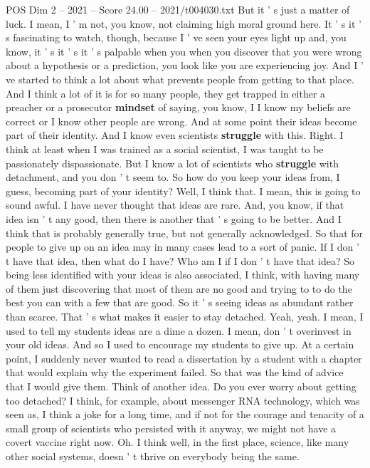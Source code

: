 \begin{textsample}{POS Dim 2 – 2021 – Score 24.00 – 2021/t004030.txt}
But it ' s just a matter of luck.
I mean, I ' m not, you know, not claiming high moral ground here.
It ' s it ' s fascinating to watch, though, because I ' ve seen your eyes light up and, you know, it ' s it ' s it ' s palpable when you when you discover that you were wrong about a hypothesis or a prediction, you look like you are experiencing joy.
And I ' ve started to think a lot about what prevents people from getting to that place.
And I think a lot of it is for so many people, they get trapped in either a preacher or a prosecutor \textbf{mindset} of saying, you know, I I know my beliefs are correct or I know other people are wrong.
And at some point their ideas become part of their identity.
And I know even scientists \textbf{struggle} with this.
Right.
I think at least when I was trained as a social scientist, I was taught to be passionately dispassionate.
But I know a lot of scientists who \textbf{struggle} with detachment, and you don ' t seem to.
So how do you keep your ideas from, I guess, becoming part of your identity?
Well, I think that.
I mean, this is going to sound awful.
I have never thought that ideas are rare.
And, you know, if that idea isn ' t any good, then there is another that ' s going to be better.
And I think that is probably generally true, but not generally acknowledged.
So that for people to give up on an idea may in many cases lead to a sort of panic.
If I don ' t have that idea, then what do I have?
Who am I if I don ' t have that idea?
So being less identified with your ideas is also associated, I think, with having many of them just discovering that most of them are no good and trying to to do the best you can with a few that are good.
So it ' s seeing ideas as abundant rather than scarce.
That ' s what makes it easier to stay detached.
Yeah, yeah.
I mean, I used to tell my students ideas are a dime a dozen.
I mean, don ' t overinvest in your old ideas.
And so I used to encourage my students to give up.
At a certain point, I suddenly never wanted to read a dissertation by a student with a chapter that would explain why the experiment failed.
So that was the kind of advice that I would give them.
Think of another idea.
Do you ever worry about getting too detached?
I think, for example, about messenger RNA technology, which was seen as, I think a joke for a long time, and if not for the courage and tenacity of a small group of scientists who persisted with it anyway, we might not have a covert vaccine right now.
Oh.
I think well, in the first place, science, like many other social systems, doesn ' t thrive on everybody being the same.

\end{textsample}
